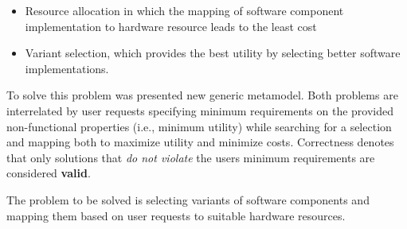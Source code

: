 \begin{itemize}
	\item Resource allocation in which the mapping of software component implementation to hardware resource leads to the least cost
	\item Variant selection, which provides the best utility by selecting better software implementations.
\end{itemize} 

To solve this problem was presented new generic metamodel. Both problems are interrelated by user requests specifying minimum requirements on the provided non-functional properties (i.e., minimum utility) while searching for a selection and mapping both to maximize utility and minimize costs. Correctness denotes that only solutions that \textit{do not violate} the users minimum requirements are considered \textbf{valid}.

The problem to be solved is selecting variants of software components and mapping them based on user requests to suitable hardware resources.

